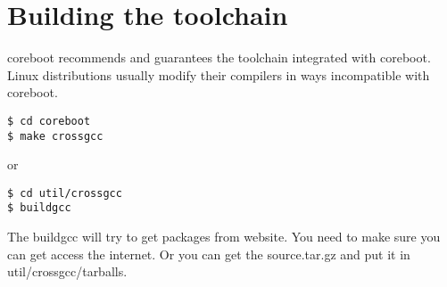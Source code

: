 \documentclass[titlepage,12pt]{article}
\begin{document}
%
%

\section{Building the toolchain}
coreboot recommends and guarantees the toolchain integrated with coreboot.
Linux distributions usually modify their compilers in ways incompatible with coreboot.

{ \small
\begin{verbatim}
$ cd coreboot
$ make crossgcc
\end{verbatim}
}

or

{ \small
\begin{verbatim}
$ cd util/crossgcc
$ buildgcc
\end{verbatim}
}

The buildgcc will try to get packages from website. You need to make sure you can
get access the internet. Or you can get the source.tar.gz and put it in util/crossgcc/tarballs.
\end{document}
